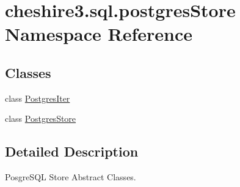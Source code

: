 \hypertarget{namespacecheshire3_1_1sql_1_1postgres_store}{\section{cheshire3.\-sql.\-postgres\-Store Namespace Reference}
\label{namespacecheshire3_1_1sql_1_1postgres_store}
}
\subsection*{Classes}
\begin{DoxyCompactItemize}
\item 
class \hyperlink{classcheshire3_1_1sql_1_1postgres_store_1_1_postgres_iter}{Postgres\-Iter}
\item 
class \hyperlink{classcheshire3_1_1sql_1_1postgres_store_1_1_postgres_store}{Postgres\-Store}
\end{DoxyCompactItemize}


\subsection{Detailed Description}
\begin{DoxyVerb}PosgreSQL Store Abstract Classes.\end{DoxyVerb}
 